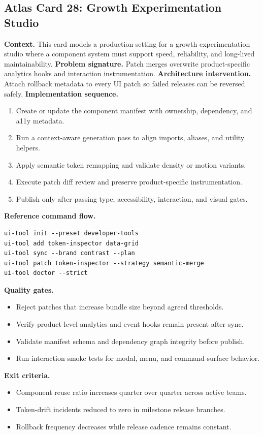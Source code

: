 \subsection*{Atlas Card 28: Growth Experimentation Studio}
\textbf{Context.} This card models a production setting for a growth experimentation studio where a component system must support speed, reliability, and long-lived maintainability.
\textbf{Problem signature.} Patch merges overwrite product-specific analytics hooks and interaction instrumentation.
\textbf{Architecture intervention.} Attach rollback metadata to every UI patch so failed releases can be reversed safely.
\textbf{Implementation sequence.}
\begin{enumerate}[leftmargin=*, itemsep=0.28em]
  \item Create or update the component manifest with ownership, dependency, and a11y metadata.
  \item Run a context-aware generation pass to align imports, aliases, and utility helpers.
  \item Apply semantic token remapping and validate density or motion variants.
  \item Execute patch diff review and preserve product-specific instrumentation.
  \item Publish only after passing type, accessibility, interaction, and visual gates.
\end{enumerate}
\textbf{Reference command flow.}
\begin{verbatim}
ui-tool init --preset developer-tools
ui-tool add token-inspector data-grid
ui-tool sync --brand contrast --plan
ui-tool patch token-inspector --strategy semantic-merge
ui-tool doctor --strict
\end{verbatim}
\textbf{Quality gates.}
\begin{itemize}[leftmargin=*, itemsep=0.24em]
  \item Reject patches that increase bundle size beyond agreed thresholds.
  \item Verify product-level analytics and event hooks remain present after sync.
  \item Validate manifest schema and dependency graph integrity before publish.
  \item Run interaction smoke tests for modal, menu, and command-surface behavior.
\end{itemize}
\textbf{Exit criteria.}
\begin{itemize}[leftmargin=*, itemsep=0.24em]
  \item Component reuse ratio increases quarter over quarter across active teams.
  \item Token-drift incidents reduced to zero in milestone release branches.
  \item Rollback frequency decreases while release cadence remains constant.
\end{itemize}
\clearpage
